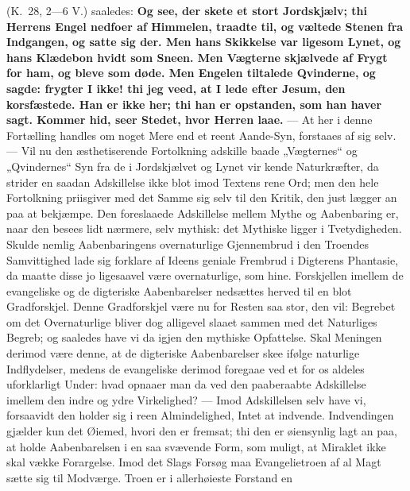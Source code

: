 \documentclass[12pt,a4paper]{book}
\begin{document}
(K.\ 28, 2---6 V.) saaledes: \textbf{Og see, der skete et stort Jordskjælv; thi Herrens
Engel nedfoer af Himmelen, traadte til, og væltede Stenen fra Indgangen, og satte sig
der. Men hans Skikkelse var ligesom Lynet, og hans Klædebon hvidt som Sneen. Men
Vægterne skjælvede af Frygt for ham, og bleve som døde. Men Engelen tiltalede
Qvinderne, og sagde: frygter I ikke! thi jeg veed, at I lede efter Jesum, den
korsfæstede. Han er ikke her; thi han er opstanden, som han haver sagt. Kommer hid, seer
Stedet, hvor Herren laae.} --- At her i denne Fortælling handles om noget Mere end et
reent Aande-Syn, forstaaes af sig selv. --- Vil nu den æsthetiserende Fortolkning
adskille baade „Vægternes“ og „Qvindernes“ Syn fra de i Jordskjælvet og Lynet vir\-%
kende Naturkræfter, da strider en saadan Adskillelse ikke blot imod Textens rene Ord; men
den hele Fortolkning priisgiver med det Samme sig selv til den Kritik, den just lægger an
paa at bekjæmpe. Den foreslaaede Adskillelse mellem Mythe og Aabenbaring er, naar den
besees lidt nærmere, selv mythisk: det Mythiske ligger i Tvetydigheden. Skulde nemlig
Aabenbaringens overnaturlige Gjennembrud i den Troendes Samvittighed lade sig forklare
af Ideens geniale Frembrud i Digterens Phantasie, da maatte disse jo ligesaavel være
overnaturlige, som hine. Forskjellen imellem de evangeliske og de digteriske
Aabenbarelser nedsættes herved til en blot Gradforskjel. Denne Gradforskjel være nu for
Resten saa stor, den vil: Begrebet om det Overnaturlige bliver dog alligevel slaaet
sammen med det Naturliges Begreb; og saaledes have vi da igjen den mythiske Opfattelse.
Skal Meningen derimod være denne, at de digteriske Aabenbarelser skee ifølge naturlige
Indflydelser, medens de evangeliske derimod foregaae ved et for os aldeles uforklarligt
Under: hvad opnaaer man da ved den paaberaabte Adskillelse imellem den indre og ydre
Virkelighed? --- Imod Adskillelsen selv have vi, forsaavidt den holder sig i reen
Almindelighed, Intet at indvende. Indvendingen gjælder kun det Øiemed, hvori den er
fremsat; thi den er øiensynlig lagt an paa, at holde Aabenbarelsen i en saa svævende
Form, som muligt, at Miraklet ikke skal vække Forargelse. Imod det Slags Forsøg maa
Evangelietroen af al Magt sætte sig til Modværge. Troen er i allerhøieste Forstand en
\end{document}
